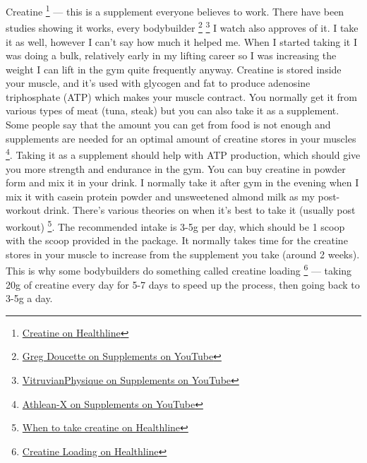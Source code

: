 \documentclass[openany, 12pt]{book}
\begin{document}
        Creatine
        \footnote{\href{https://www.healthline.com/nutrition/what-is-creatine}{Creatine on Healthline}} --- this is a supplement everyone believes to work. There have been studies
        showing it works, every bodybuilder
        \footnote{\href{https://www.youtube.com/watch?v=W9Kas49cNnU}{Greg Doucette on Supplements on YouTube}}
        \footnote{\href{https://www.youtube.com/watch?v=6Xj1MNJK-iA}{VitruvianPhysique on Supplements on YouTube}}
        I watch also approves of it. I take it as well, however I can't say how much it helped me. When I started taking it I was doing a bulk, relatively
        early in my lifting career so I was increasing the weight I can lift in the gym quite frequently anyway. Creatine is stored inside your muscle, and it's used with glycogen and fat to produce
        adenosine triphosphate (ATP) which makes your muscle contract. You normally get it from various types of meat (tuna, steak) but you can also take it as a supplement. Some people say that
        the amount you can get from food is not enough and supplements are needed for an optimal amount of creatine stores in your muscles
        \footnote{\href{https://www.youtube.com/watch?v=sREg8GrkPio}{Athlean-X on Supplements on YouTube}}.
        Taking it as a supplement should help with ATP production, which should give you more strength and endurance in the gym.
        You can buy creatine in powder form and mix it in your drink. I normally take it after gym in the evening when I mix it with casein protein powder and unsweetened almond milk as my
        post-workout drink. There's various theories on when it's best to take it (usually post workout)
        \footnote{\href{https://www.healthline.com/nutrition/best-time-for-creatine}{When to take creatine on Healthline}}.
        The recommended intake is 3-5g per day, which should be 1 scoop with the scoop provided in the package. It normally takes time for the creatine stores in your muscle
        to increase from the supplement you take (around 2 weeks). This is why some bodybuilders do something called creatine loading
        \footnote{\href{https://www.healthline.com/nutrition/creatine-loading-phase}{Creatine Loading on Healthline}} --- taking 20g of creatine every day for 5-7 days to speed up the process,
        then going back to 3-5g a day.
\end{document}
